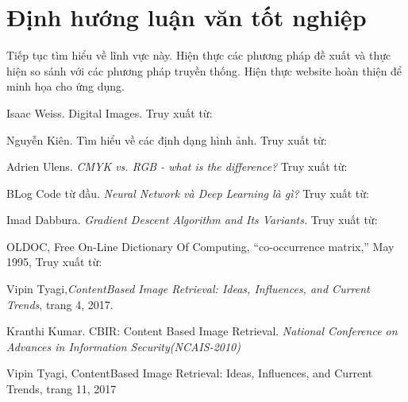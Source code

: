 \documentclass[a4paper,14pt]{extreport}
\begin{document}
\section{Định hướng luận văn tốt nghiệp}

Tiếp tục tìm hiểu về lĩnh vực này. Hiện thực các phương pháp đề xuất và thực hiện so sánh với các phương pháp truyền thống. Hiện thực website hoàn thiện để minh họa cho ứng dụng.

\medskip

\begin{thebibliography}{9}

Isaac Weiss. Digital Images. Truy xuất từ: \texttt{}

Nguyễn Kiên. Tìm hiểu về các định dạng hình ảnh. Truy xuất từ: \texttt{}

Adrien Ulens. \textit{CMYK vs. RGB - what is the difference?} Truy xuất từ: \\\texttt{}

BLog Code từ đầu. \textit{Neural Network và Deep Learning là gì?} Truy xuất từ: \texttt{}

Imad Dabbura. \textit{Gradient Descent Algorithm and Its Variants.} Truy xuất từ: \\\texttt{}

OLDOC, Free On-Line Dictionary Of Computing, “co-occurrence matrix,” May 1995, Truy xuất từ: \texttt{}

Vipin Tyagi,\textit{ContentBased Image Retrieval: Ideas, Influences, and Current Trends}, trang 4, 2017.


Kranthi Kumar. CBIR: Content Based Image Retrieval. \textit{National Conference on Advances in Information Security(NCAIS-2010)}

Vipin Tyagi, ContentBased Image Retrieval: Ideas, Influences, and Current Trends, trang 11, 2017



\end{thebibliography}
\end{document}
